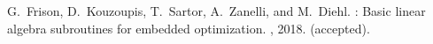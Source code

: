 \documentclass[a4paper]{report}
\begin{document}


%

\begin{thebibliography}{1}

G.~Frison, D.~Kouzoupis, T.~Sartor, A.~Zanelli, and M.~Diehl.
: Basic linear algebra subroutines for embedded
  optimization.
, 2018.
\newblock (accepted).

\end{thebibliography}
\end{document}
